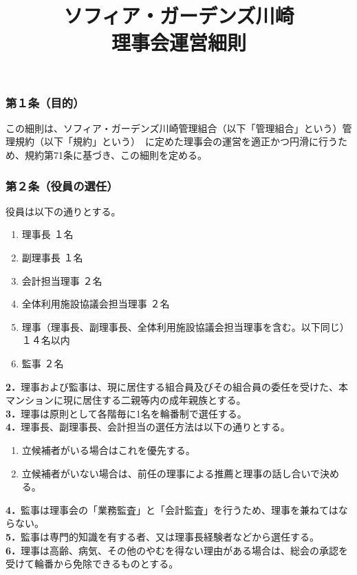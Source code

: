 \documentclass[12pt,uplatex]{jsarticle}
\title{ソフィア・ガーデンズ川崎 \\  理事会運営細則}
\begin{document}

\maketitle
\tableofcontents
\clearpage
\addtocounter{page}{-1}
\pagestyle{plain}

\subsubsection*{ 第１条（目的）}
この細則は、ソフィア・ガーデンズ川崎管理組合（以下「管理組合」という）管理規約（以下「規約」という）\
に定めた理事会の運営を適正かつ円滑に行うため、規約第71条に基づき、この細則を定める。
\subsubsection*{ 第２条（役員の選任）}
役員は以下の通りとする。
\begin{enumerate}
\item 理事長				１名
\item 副理事長				１名
\item 会計担当理事				２名
\item 全体利用施設協議会担当理事		２名
\item 理事（理事長、副理事長、全体利用施設協議会担当理事を含む。以下同じ） １４名以内
\item 監事    ２名
\end{enumerate}
\textbf{2．}理事および監事は、現に居住する組合員及びその組合員の委任を受けた、本マンションに現に居住する二親等内の成年親族とする。\\
\textbf{3．}理事は原則として各階毎に1名を輪番制で選任する。\\
\textbf{4．}理事長、副理事長、会計担当の選任方法は以下の通りとする。
\begin{enumerate}
\item 立候補者がいる場合はこれを優先する。
\item 立候補者がいない場合は、前任の理事による推薦と理事の話し合いで決める。
\end{enumerate}
\textbf{4．}監事は理事会の「業務監査」と「会計監査」を行うため、理事を兼ねてはならない。\\
\textbf{5．}監事は専門的知識を有する者、又は理事長経験者などから選任する。\\
\textbf{6．}理事は高齢、病気、その他のやむを得ない理由がある場合は、総会の承認を受けて輪番から免除できるものとする。\\
\end{document}
